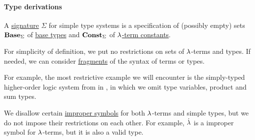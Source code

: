 \paragraph{Type derivations}

\begin{definition}\label{def:simple_type_signature}\mimprovised
  A \hyperref[con:logical_system_signature]{signature} \( \Sigma \) for simple type systems is a specification of (possibly empty) sets \( \op*{Base}_\Sigma \) of \hyperref[def:simple_type]{base types} and \( \op*{Const}_\Sigma \) of \hyperref[def:lambda_term]{\( {\mathrm \lambda} \)-term constants}.
\end{definition}
\begin{comments}
  \item For simplicity of definition, we put no restrictions on sets of \( {\mathrm \lambda} \)-terms and types. If needed, we can consider \hyperref[con:syntax_fragment]{fragments} of the syntax of terms or types.

  For example, the most restrictive example we will encounter is the simply-typed higher-order logic system from in , in which we omit type variables, product and sum types.

  \item We disallow certain \hyperref[con:improper_symbol]{improper symbols} for both \( {\mathrm \lambda} \)-terms and simple types, but we do not impose their restrictions on each other. For example, \( \mathord{\dot{{\mathrm \lambda}}} \) is a improper symbol for \( {\mathrm \lambda} \)-terms, but it is also a valid type.
\end{comments}

